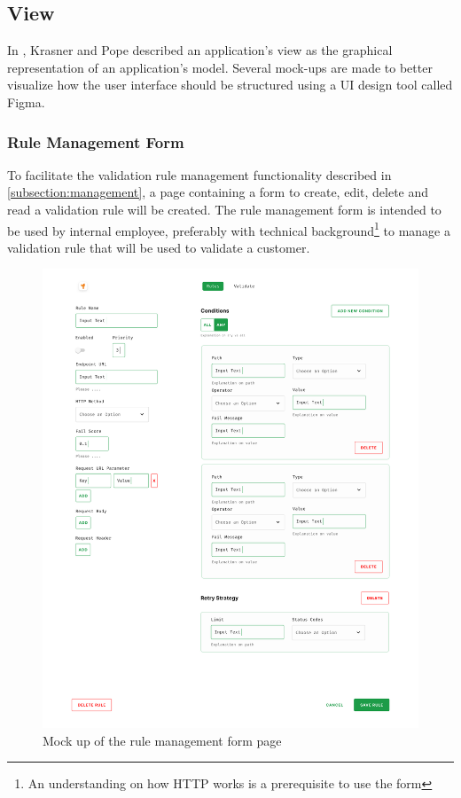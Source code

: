 \subsection{View}

In \autocite{krasner-pope-88}, Krasner and Pope described an application's view as the graphical representation of an application's model. Several mock-ups are made to better visualize how the user interface should be structured using a UI design tool called Figma.  


\subsubsection{Rule Management Form}

To facilitate the validation rule management functionality described in \autoref{subsection:management}, a page containing a form to create, edit, delete and read a validation rule will be created. The rule management form is intended to be used by internal employee, preferably with technical background\footnote{An understanding on how HTTP works is a prerequisite to use the form} to manage a validation rule that will be used to validate a customer.

\begin{figure}[!h]
 \includegraphics[width=\textwidth]{diagrams/mockup_rule_management.png}
 \caption{Mock up of the rule management form page}
\end{figure}

